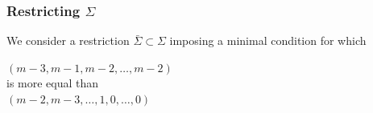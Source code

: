 \documentclass[aspectratio=169]{beamer}
\begin{document}
\begin{frame}
	\frametitle{Restricting $\Sigma$}
	We consider a restriction $\bar{\Sigma}\subset\Sigma$ imposing a minimal condition for which \vspace{1em} 
	\begin{center}
		$(m-3, m-1, m-2, \dots, m-2)$ \\ \vspace{1em} is more equal than \\ \vspace{1em} $(m-2, m-3, \dots, 1, 0, \dots, 0)$ 
	\end{center}
	
\end{frame}
\end{document}
